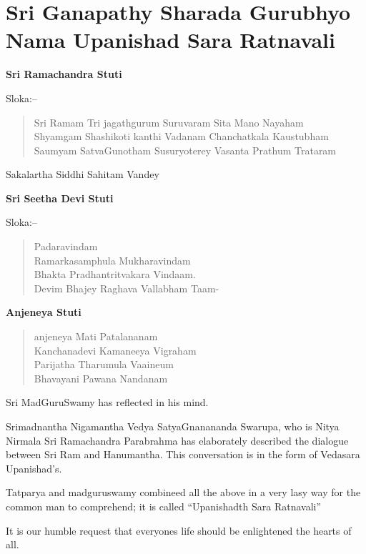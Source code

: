 
\chapter*{Sri Ganapathy Sharada Gurubhyo Nama Upanishad Sara Ratnavali}

\begin{center}
\textbf{Sri Ramachandra Stuti}
\end{center}

Sloka:–

\begin{verse}
 Sri Ramam Tri jagathgurum Suruvaram Sita Mano Nayaham \\
 Shyamgam Shashikoti kanthi Vadanam Chanchatkala Kaustubham \\
 Saumyam SatvaGunotham Susuryoterey Vasanta Prathum Trataram
\end{verse}

\begin{center}
Sakalartha Siddhi Sahitam Vandey
\end{center}

\begin{center}
\end{center}

\begin{center}
\textbf{Sri Seetha Devi Stuti}
\end{center}

Sloka:–

\begin{verse}
  Padaravindam\\
 Ramarkasamphula Mukharavindam\\
 Bhakta Pradhantritvakara Vindaam.\\
 Devim Bhajey Raghava Vallabham Taam-
\end{verse}

\begin{center}
\textbf{Anjeneya Stuti}
\end{center}

\begin{verse}
 anjeneya Mati Patalananam \\
 Kanchanadevi Kamaneeya Vigraham\\
 Parijatha Tharumula Vaaineum\\
 Bhavayani Pawana Nandanam
\end{verse}

Sri MadGuruSwamy has reflected in his mind.

Srimadnantha Nigamantha Vedya SatyaGnanananda Swarupa, who is Nitya Nirmala Sri Ramachandra Parabrahma has elaborately described the dialogue between Sri Ram and Hanumantha. This conversation is in the form of Vedasara Upanishad's.

Tatparya and madguruswamy combineed all the above in a very lasy way for the common man to comprehend; it is called “Upanishadth Sara Ratnavali”

It is our humble request that everyones life should be enlightened the hearts of all.

